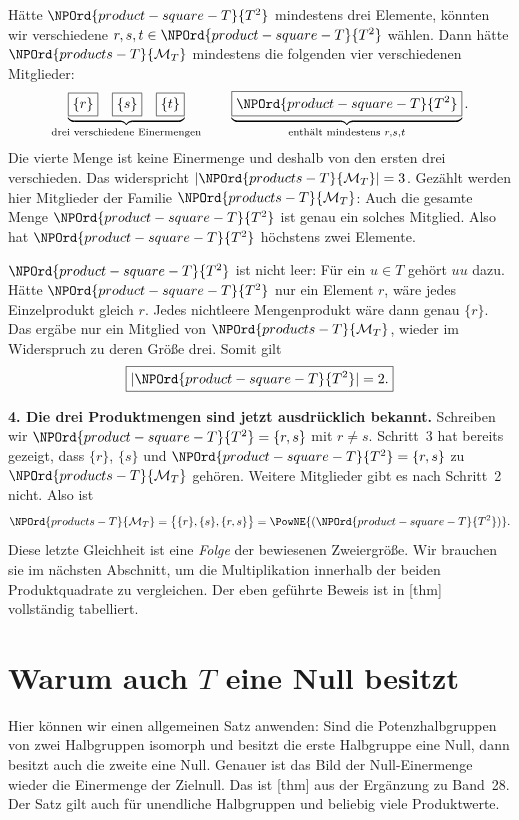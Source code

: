 Hätte \(\NPOrd{product-square-T}{T^2}\) mindestens drei Elemente, könnten wir verschiedene
\(r,s,t\in \NPOrd{product-square-T}{T^2}\) wählen. Dann hätte \(\NPOrd{products-T}{\mathcal M_T}\) mindestens
die folgenden vier verschiedenen Mitglieder:
\[
 \underbrace{\boxed{\{r\}}\quad\boxed{\{s\}}\quad\boxed{\{t\}}}_{%
   \text{drei verschiedene Einermengen}}
 \qquad
 \underbrace{\boxed{\NPOrd{product-square-T}{T^2}}}_{\text{enthält mindestens }r,s,t}.
\]
Die vierte Menge ist keine Einermenge und deshalb von den ersten
drei verschieden. Das widerspricht \(\lvert\NPOrd{products-T}{\mathcal M_T}\rvert=3\).
Gezählt werden hier Mitglieder der Familie \(\NPOrd{products-T}{\mathcal M_T}\):
Auch die gesamte Menge \(\NPOrd{product-square-T}{T^2}\) ist genau ein solches Mitglied.
Also hat \(\NPOrd{product-square-T}{T^2}\) höchstens zwei Elemente.

\(\NPOrd{product-square-T}{T^2}\) ist nicht leer: Für ein \(u\in T\) gehört \(uu\) dazu.
Hätte \(\NPOrd{product-square-T}{T^2}\) nur ein Element \(r\), wäre jedes Einzelprodukt
gleich \(r\). Jedes nichtleere Mengenprodukt wäre dann genau
\(\{r\}\). Das ergäbe nur ein Mitglied von \(\NPOrd{products-T}{\mathcal M_T}\),
wieder im Widerspruch zu deren Größe drei. Somit gilt
\[
 \boxed{|\NPOrd{product-square-T}{T^2}|=2.}
\]

\medskip\noindent\textbf{4. Die drei Produktmengen sind jetzt ausdrücklich bekannt.}
Schreiben wir \(\NPOrd{product-square-T}{T^2}=\{r,s\}\) mit \(r\ne s\).
Schritt~3 hat bereits gezeigt, dass \(\{r\}\), \(\{s\}\) und
\(\NPOrd{product-square-T}{T^2}=\{r,s\}\) zu \(\NPOrd{products-T}{\mathcal M_T}\) gehören.
Weitere Mitglieder gibt es nach Schritt~2 nicht. Also ist
\[
 \NPOrd{products-T}{\mathcal M_T}=\bigl\{\{r\},\{s\},\{r,s\}\bigr\}
             =\PowNE{(\NPOrd{product-square-T}{T^2})}.
\]
Diese letzte Gleichheit ist eine \emph{Folge} der bewiesenen Zweiergröße.
Wir brauchen sie im nächsten Abschnitt, um die Multiplikation
innerhalb der beiden Produktquadrate zu vergleichen.
Der eben geführte Beweis ist in
[thm] vollständig tabelliert.

\par{}
\section*{Warum auch \(T\) eine Null besitzt}

Hier können wir einen allgemeinen Satz anwenden:
Sind die Potenzhalbgruppen von zwei Halbgruppen isomorph und besitzt
die erste Halbgruppe eine Null, dann besitzt auch die zweite eine Null.
Genauer ist das Bild der Null-Einermenge wieder die Einermenge der
Zielnull. Das ist [thm]
aus der Ergänzung zu Band~28. Der Satz gilt auch für unendliche
Halbgruppen und beliebig viele Produktwerte.

